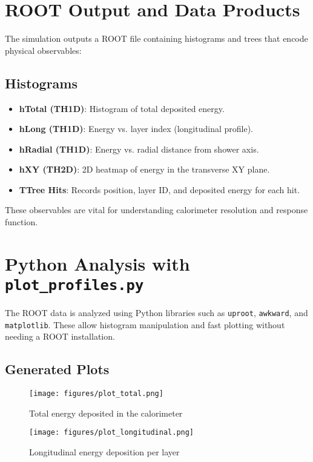 \documentclass[11pt]{article}
\begin{document}
\section{ROOT Output and Data Products}

The simulation outputs a ROOT file containing histograms and trees that encode physical observables:

\subsection*{Histograms}
\begin{itemize}
  \item \textbf{hTotal (TH1D)}: Histogram of total deposited energy.
  \item \textbf{hLong (TH1D)}: Energy vs. layer index (longitudinal profile).
  \item \textbf{hRadial (TH1D)}: Energy vs. radial distance from shower axis.
  \item \textbf{hXY (TH2D)}: 2D heatmap of energy in the transverse XY plane.
  \item \textbf{TTree Hits}: Records position, layer ID, and deposited energy for each hit.
\end{itemize}

These observables are vital for understanding calorimeter resolution and response function.

\section{Python Analysis with \texttt{plot\_profiles.py}}

The ROOT data is analyzed using Python libraries such as \texttt{uproot}, \texttt{awkward}, and \texttt{matplotlib}. These allow histogram manipulation and fast plotting without needing a ROOT installation.

\subsection*{Generated Plots}
\vspace{-0.5em}
\begin{figure}[h!]
  \centering
  \texttt{[image: figures/plot\_total.png]}
  \caption{Total energy deposited in the calorimeter}
\end{figure}

\begin{figure}[h!]
  \centering
  \texttt{[image: figures/plot\_longitudinal.png]}
  \caption{Longitudinal energy deposition per layer}
\end{figure}
\end{document}
